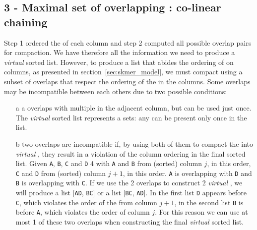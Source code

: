 \subsection{3 - Maximal set of overlapping \kmers: co-linear chaining}
Step 1 ordered the \kmers of each column and step 2 computed all possible \kmer overlap pairs for compaction. We have therefore all the information we need to produce a \emph{virtual} \skmer sorted list.
However, to produce a list that abides the ordering of \kmers on columns, as presented in section~\ref{sec:skmer_model}, we must compact \kmers using a subset of overlaps that respect the ordering of the \kmers in the columns. Some overlaps may be incompatible between each others due to two possible conditions:
\begin{itemize}
	\item[a] a \kmer overlaps with multiple \kmers in the adjacent column, but can be used just once. The \emph{virtual} \skmer sorted list represents a \kmer sets: any \kmer can be present only once in the list.
	\item[b] two overlaps are incompatible if, by using both of them to compact the \kmers into \emph{virtual} \skmer, they result in a violation of the column ordering in the final sorted list. Given \texttt{A}, \texttt{B}, \texttt{C} and \texttt{D} 4 \kmers with \texttt{A} and \texttt{B} from (sorted) column $j$, in this order, \texttt{C} and \texttt{D} from (sorted) column $j+1$, in this order. \texttt{A} is overlapping with \texttt{D} and \texttt{B} is overlapping with \texttt{C}. If we use the 2 overlaps to construct 2 \emph{virtual} \skmers, we will produce a list [\texttt{AD}, \texttt{BC}] or a list [\texttt{BC}, \texttt{AD}]. In the first list \texttt{D} appears before \texttt{C}, which violates the order of the \kmers from column $j+1$, in the second list \texttt{B} is before \texttt{A}, which violates the order of column $j$. For this reason we can use at most 1 of these two overlaps when constructing the final \emph{virtual} \skmer sorted list.
\end{itemize}

